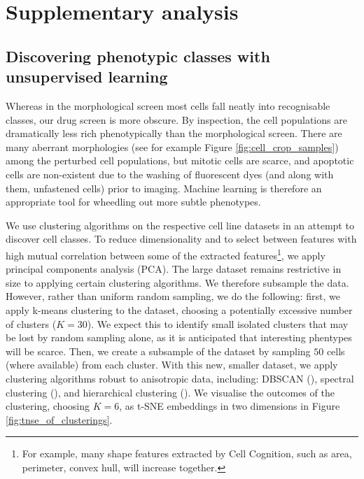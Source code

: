 
\chapter{Supplementary analysis} %
\label{AppendixE} %


\section{Discovering phenotypic classes with unsupervised learning}

Whereas in the morphological screen most cells fall neatly into recognisable classes, our drug screen is more obscure. By inspection, the cell populations are dramatically less rich phenotypically than the morphological screen. There are many aberrant morphologies (see for example Figure \ref{fig:cell_crop_samples}) among the perturbed cell populations, but mitotic cells are scarce, and apoptotic cells are non-existent due to the washing of fluorescent dyes (and along with them, unfastened cells) prior to imaging. Machine learning is therefore an appropriate tool for wheedling out more subtle phenotypes.

We use clustering algorithms on the respective cell line datasets in an attempt to discover cell classes. To reduce dimensionality and to select between features with high mutual correlation between some of the extracted features\footnote{For example, many shape features extracted by Cell Cognition, such as area, perimeter, convex hull, will increase together.}, we apply principal components analysis (PCA). The large dataset remains restrictive in size to applying certain clustering algorithms. We therefore subsample the data. However, rather than uniform random sampling, we do the following: first, we apply k-means clustering to the dataset, choosing a potentially excessive number of clusters ($K = 30$). We expect this to identify small isolated clusters that may be lost by random sampling alone, as it is anticipated that interesting phentypes will be scarce. Then, we create a subsample of the dataset by sampling $50$ cells (where available) from each cluster. With this new, smaller dataset, we apply clustering algorithms robust to anisotropic data, including: DBSCAN (\cite{ester1996density}), spectral clustering (\cite{von2007tutorial}), and hierarchical clustering (\cite{ward1963hierarchical}). We visualise the outcomes of the clustering, choosing $K = 6$, as t-SNE embeddings in two dimensions in Figure \ref{fig:tnse_of_clusterings}.

